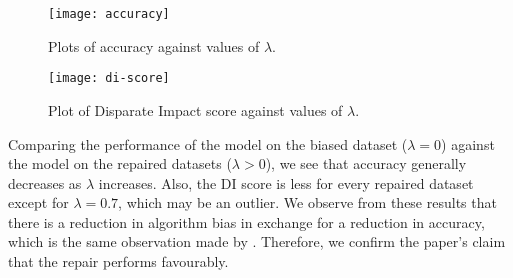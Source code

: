 \documentclass[conference]{IEEEtran}
\begin{document}
\begin{figure}[ht]
    \centering
    \texttt{[image: accuracy]}
    \caption{Plots of accuracy against values of $\lambda$.}
    \label{fig:1}
\end{figure}

\begin{figure}[ht]
    \centering
    \texttt{[image: di-score]}
    \caption{Plot of Disparate Impact score against values of $\lambda$.}
    \label{fig:2}
\end{figure}

Comparing the performance of the model on the biased dataset ($\lambda = 0$) against the model on the repaired datasets ($\lambda > 0$), we see that accuracy generally decreases as $\lambda$ increases. Also, the DI score is less for every repaired dataset except for $\lambda=0.7$, which may be an outlier. We observe from these results that there is a reduction in algorithm bias in exchange for a reduction in accuracy, which is the same observation made by \cite{Feldman2015ComputationalFP}. Therefore, we confirm the paper's claim that the repair performs favourably.



\end{document}
